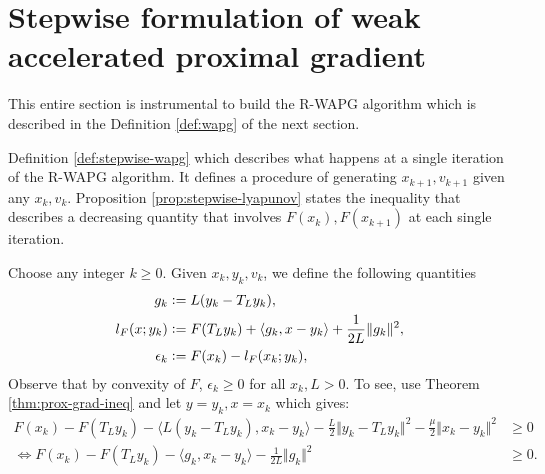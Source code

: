 \documentclass[12pt]{article}
\begin{document}
\section{Stepwise formulation of weak accelerated proximal gradient}\label{sec:stepwise-stuff}
    This entire section is instrumental to build the R-WAPG algorithm which is described in the Definition \ref{def:wapg} of the next section. 
    \par 
    Definition \ref{def:stepwise-wapg} which describes what happens at a single iteration of the R-WAPG algorithm. 
    It defines a procedure of generating $x_{k + 1}, v_{k + 1}$ given any $x_k, v_k$. 
    Proposition \ref{prop:stepwise-lyapunov} states the inequality that describes a decreasing quantity that involves $F(x_k), F(x_{k + 1})$ at each single iteration. 
    \begin{assumption}
        Choose any integer $k\ge 0$. 
        Given $x_k, y_k, v_k$, we define the following quantities
        \begin{align}
            g_k &\vcentcolon= L(y_k - T_L y_k), 
            \label{eqn:grad-map}
            \\
            l_F(x; y_k) &\vcentcolon= F(T_Ly_k) + \langle g_k, x - y_k\rangle + \frac{1}{2L}\Vert g_k\Vert^2, 
            \label{eqn:lower-linearization}
            \\
            \epsilon_{k} &\vcentcolon= F(x_k) - l_F(x_k; y_k), 
            \label{eqn:regret}
        \end{align}
        Observe that by convexity of $F$, $\epsilon_k \ge 0$ for all $x_k, L > 0$. 
        To see, use Theorem \ref{thm:prox-grad-ineq} and let $y = y_k, x = x_k$ which gives: 
        \begin{align*}
            F(x_k) - F(T_Ly_k)
            - \langle L(y_k - T_Ly_k),x_k - y_k \rangle
            - \frac{L}{2}\Vert y_k - T_Ly_k\Vert^2
            - \frac{\mu}{2}\Vert x_k - y_k\Vert^2
            &\ge 0
            \\
            \iff 
            F(x_k) - F(T_Ly_k)
            - \langle g_k,x_k - y_k \rangle
            - \frac{1}{2L}\Vert g_k\Vert^2
            &\ge 0. 
        \end{align*}
    \end{assumption}
    
\end{document}
